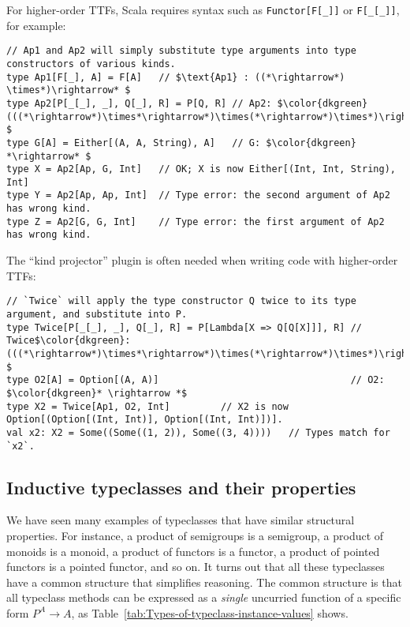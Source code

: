 For higher-order TTFs, Scala requires syntax such as \lstinline!Functor[F[_]]!
or \lstinline!F[_[_]]!, for example:
\begin{lstlisting}[mathescape=true]
// Ap1 and Ap2 will simply substitute type arguments into type constructors of various kinds.
type Ap1[F[_], A] = F[A]   // $\text{Ap1} : ((*\rightarrow*) \times*)\rightarrow* $
type Ap2[P[_[_], _], Q[_], R] = P[Q, R] // Ap2: $\color{dkgreen}(((*\rightarrow*)\times*\rightarrow*)\times(*\rightarrow*)\times*)\rightarrow* $
type G[A] = Either[(A, A, String), A]   // G: $\color{dkgreen} *\rightarrow* $
type X = Ap2[Ap, G, Int]   // OK; X is now Either[(Int, Int, String), Int]
type Y = Ap2[Ap, Ap, Int]  // Type error: the second argument of Ap2 has wrong kind.
type Z = Ap2[G, G, Int]    // Type error: the first argument of Ap2 has wrong kind.
\end{lstlisting}
The \textsf{``}kind projector\textsf{''} plugin is often needed when writing code
with higher-order TTFs:
\begin{lstlisting}[mathescape=true]
// `Twice` will apply the type constructor Q twice to its type argument, and substitute into P.
type Twice[P[_[_], _], Q[_], R] = P[Lambda[X => Q[Q[X]]], R] // Twice$\color{dkgreen}:(((*\rightarrow*)\times*\rightarrow*)\times(*\rightarrow*)\times*)\rightarrow* $
type O2[A] = Option[(A, A)]                                  // O2: $\color{dkgreen}* \rightarrow *$
type X2 = Twice[Ap1, O2, Int]         // X2 is now Option[(Option[(Int, Int)], Option[(Int, Int)])].
val x2: X2 = Some((Some((1, 2)), Some((3, 4))))   // Types match for `x2`.
\end{lstlisting}


\subsection{Inductive typeclasses and their properties\label{subsec:Inductive-typeclasses}}

We have seen many examples of typeclasses that have similar structural
properties. For instance, a product of semigroups is a semigroup,
a product of monoids is a monoid, a product of functors is a functor,
a product of pointed functors is a pointed functor, and so on. It
turns out that all these typeclasses have a common structure that
simplifies reasoning. The common structure is that all typeclass methods
can be expressed as a \emph{single} uncurried function of a specific
form $P^{A}\rightarrow A$, as Table~\ref{tab:Types-of-typeclass-instance-values}
shows.

